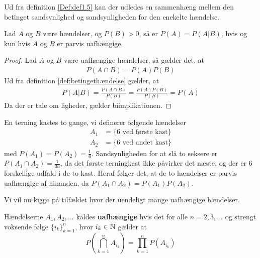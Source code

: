 Ud fra definition \ref{Def:def1.5} kan der udledes en sammenhæng mellem den betinget sandsynlighed og sandsynligheden for den enekelte hændelse. 
\begin{cor} %
    Lad $A$ og $B$ være hændelser, og $P(B) > 0$, så er $P(A)=P(A|B)$, hvis og kun hvis $A$ og $B$ er parvis uafhængige.   
\end{cor}
\begin{proof}
Lad $A$ og $B$ være uafhængige hændelser, så gælder det, at 
\begin{align*}
    P(A\cap B)=P(A)P(B)
\end{align*}
Ud fra definition \ref{def:betingethændelse} gælder, at 
\begin{align*}
    P(A|B)=\frac{P(A\cap B)}{P(B)} =\frac{P(A)P(B)}{P(B)}=P(A)
\end{align*}
Da der er tale om ligheder, gælder biimplikationen.
\end{proof}

\begin{exmp} \label{exp:terning}
En terning kastes to gange, vi definerer følgende hændelser
\begin{align*}
  A_1 &=\{6 \text{ ved første kast}\} \\ A_2 &= \{6 \text{ ved andet kast}\} 
\end{align*}
med $P(A_1) = P(A_2) = \frac{1}{6}$. Sandsynligheden for at slå to seksere er $P(A_1 \cap A_2)=\frac{1}{36}$, da det første terningkast ikke påvirker det næste, og der er $6$ forskellige udfald i de to kast. Heraf følger det, at de to hændelser er parvis uafhængige af hinanden, da $P(A_1 \cap A_2) = P(A_1)P(A_2)$.
\end{exmp}

Vi vil nu kigge på tilfældet hvor der uendeligt mange uafhængige hændelser.
\begin{defn}
    Hændelserne $A_1, A_2, \ldots$ kaldes \textbf{uafhængige} hvis det for alle $n = 2, 3, \ldots$ og strengt voksende følge $\{i_k\}^n_{k = 1}$, hvor $i_k \in \mathbb{N}$ gælder at
    \begin{equation*}
        P\left(\bigcap_{k = 1}^n A_{i_k} \right) = \prod_{k = 1}^n P(A_{i_k})
    \end{equation*}
\end{defn}

%

